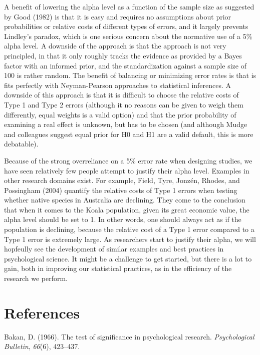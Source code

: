 \documentclass[,jou,floatsintext]{apa6}
\begin{document}
A benefit of lowering the alpha level as a function of the sample size as suggested by Good (1982) is that it is easy and requires no assumptions about prior probabilities or relative costs of different types of errors, and it largely prevents Lindley's paradox, which is one serious concern about the normative use of a 5\% alpha level. A downside of the approach is that the approach is not very principled, in that it only roughly tracks the evidence as provided by a Bayes factor with an informed prior, and the standardization against a sample size of 100 is rather random. The benefit of balancing or minimizing error rates is that is fits perfectly with Neyman-Pearson approaches to statistical inferences. A downside of this approach is that it is difficult to choose the relative costs of Type 1 and Type 2 errors (although it no reasons can be given to weigh them differently, equal weights is a valid option) and that the prior probability of examining a real effect is unknown, but has to be chosen (and although Mudge and colleagues suggest equal prior for H0 and H1 are a valid default, this is more debatable).

Because of the strong overreliance on a 5\% error rate when designing studies, we have seen relatively few people attempt to justify their alpha level. Examples in other research domains exist. For example, Field, Tyre, Jonzén, Rhodes, and Possingham (2004) quantify the relative costs of Type 1 errors when testing whether native species in Australia are declining. They come to the conclusion that when it comes to the Koala population, given its great economic value, the alpha level should be set to 1. In other words, one should always act as if the population is declining, because the relative cost of a Type 1 error compared to a Type 1 error is extremely large. As researchers start to justify their alpha, we will hopfeully see the development of similar examples and best practices in psychological science. It might be a challenge to get started, but there is a lot to gain, both in improving our statistical practices, as in the efficiency of the research we perform.

\hypertarget{references}{%
\section{References}\label{references}}

\setlength{\parindent}{-0.5in}
\setlength{\leftskip}{0.5in}

\hypertarget{refs}{}
\leavevmode\hypertarget{ref-bakan_test_1966}{}%
Bakan, D. (1966). The test of significance in psychological research. \emph{Psychological Bulletin}, \emph{66}(6), 423--437.
\end{document}
